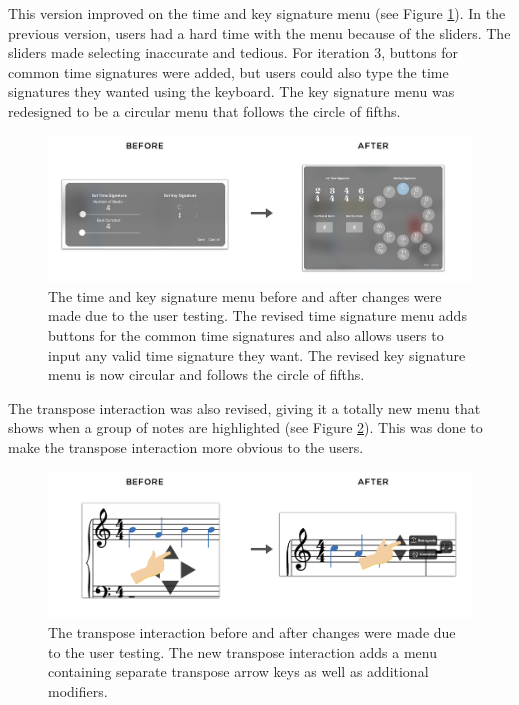				This version improved on the time and key signature menu (see Figure \ref{fig:before-after-tsmenu}). In the previous version, users had a hard time with the menu because of the sliders. The sliders made selecting inaccurate and tedious. For iteration 3, buttons for common time signatures were added, but users could also type the time signatures they wanted using the keyboard. The key signature menu was redesigned to be a circular menu that follows the circle of fifths. 

				\begin{figure}[H]
					\centering
					\includegraphics[scale=0.28]{figures/before-after-tsmenu}
				    \caption{The time and key signature menu before and after changes were made due to the user testing. The revised time signature menu adds buttons for the common time signatures and also allows users to input any valid time signature they want. The revised key signature menu is now circular and follows the circle of fifths.}
				    \label{fig:before-after-tsmenu}
				\end{figure} 

				The transpose interaction was also revised, giving it a totally new menu that shows when a group of notes are highlighted (see Figure \ref{fig:before-after-transpose}). This was done to make the transpose interaction more obvious to the users.

				\begin{figure}[h]
					\centering
					\includegraphics[scale=0.25]{figures/before-after-transpose}
				    \caption{The transpose interaction before and after changes were made due to the user testing. The new transpose interaction adds a menu containing separate transpose arrow keys as well as additional modifiers.}
				    \label{fig:before-after-transpose}
				\end{figure}

